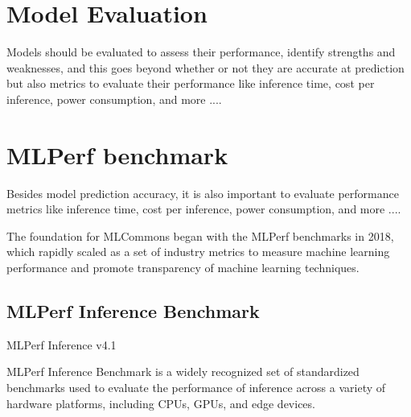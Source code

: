 \documentclass{article}
\begin{document}
\section{Model Evaluation}

Models should be evaluated to assess their performance, identify strengths and weaknesses, and this goes beyond whether or not they are accurate at prediction but also metrics to evaluate their performance like inference time, cost per inference, power consumption, and more ....




\section{MLPerf benchmark}

Besides model prediction accuracy, it is also important to evaluate performance metrics like inference time, cost per inference, power consumption, and more ....

The foundation for MLCommons began with the MLPerf benchmarks in 2018, which rapidly scaled as a set of industry metrics to measure machine learning performance and promote transparency of machine learning techniques.

\subsection{MLPerf Inference Benchmark}

MLPerf Inference v4.1  \cite{DBLP:journals/corr/abs-1911-02549}

MLPerf Inference Benchmark is a widely recognized set of standardized benchmarks used to evaluate the performance of inference across a variety of hardware platforms, including CPUs, GPUs, and edge devices. 
\end{document}
